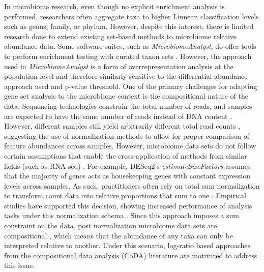 \documentclass[10pt,letterpaper]{article}
\begin{document}


In microbiome research, even though no explicit enrichment analysis is performed, researchers often aggregate taxa to higher Linnean classification levels such as genus, family, or phylum. However, despite this interest, there is limited research done to extend existing set-based methods to microbiome relative abundance data. Some software suites, such as \emph{MicrobiomeAnalyst}, do offer tools to perform enrichment testing with curated taxon sets \cite{chong2020}. However, the approach used in \emph{MicrobiomeAnalyst} is a form of overrepresentation analysis at the population level and therefore similarly sensitive to the differential abundance approach used and p-value threshold. One of the primary challenges for adapting gene set analysis to the microbiome context is the compositional nature of the data. Sequencing technologies constrain the total number of reads, and samples are expected to have the same number of reads instead of DNA content \cite{quinn2019, quinn2018}. However, different samples still yield arbitrarily different total read counts \cite{morton2019, gloor2017}, suggesting the use of normalization methods to allow for proper comparison of feature abundances across samples. However, microbiome data sets do not follow certain assumptions that enable the cross-application of methods from similar fields (such as RNA-seq) \cite{quinn2019, quinn2018}. For example, DESeq2's \emph{estimateSizeFactors} \cite{love2014} assumes that the majority of genes acts as housekeeping genes with constant expression levels across samples. As such, practitioners often rely on total sum normalization to transform count data into relative proportions that sum to one \cite{weiss2017}. Empirical studies have supported this decision, showing increased performance of analysis tasks under this normalization schema \cite{mcknight2019}. Since this approach imposes a sum constraint on the data, post normalization microbiome data sets are compositional \cite{gloor2017}, which means that the abundance of any taxa can only be interpreted relative to another. Under this scenario, log-ratio based approaches from the compositional data analysis (CoDA) literature \cite{aitchison1994} are motivated to address this issue. 
\end{document}
